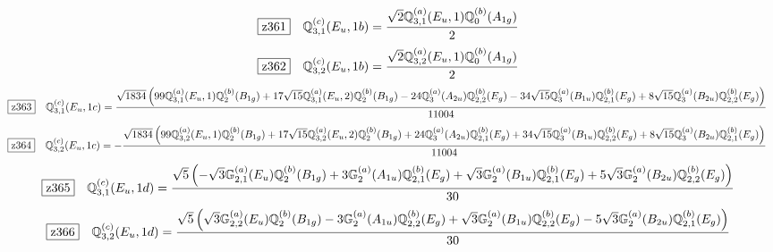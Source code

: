 \documentclass[fleqn,10pt,landscape]{jsarticle}
\begin{document}
\begin{dmath*}
\hspace*{3mm}\fbox{z361}\quad \mathbb{Q}_{3,1}^{(c)}(E_{u},1b)=\frac{\sqrt{2} \mathbb{Q}_{3,1}^{(a)}(E_{u},1) \mathbb{Q}_{0}^{(b)}(A_{1g})}{2}
\end{dmath*}
\begin{dmath*}
\hspace*{3mm}\fbox{z362}\quad \mathbb{Q}_{3,2}^{(c)}(E_{u},1b)=\frac{\sqrt{2} \mathbb{Q}_{3,2}^{(a)}(E_{u},1) \mathbb{Q}_{0}^{(b)}(A_{1g})}{2}
\end{dmath*}
\begin{dmath*}
\hspace*{3mm}\fbox{z363}\quad \mathbb{Q}_{3,1}^{(c)}(E_{u},1c)=\frac{\sqrt{1834} \left(99 \mathbb{Q}_{3,1}^{(a)}(E_{u},1) \mathbb{Q}_{2}^{(b)}(B_{1g}) + 17 \sqrt{15} \mathbb{Q}_{3,1}^{(a)}(E_{u},2) \mathbb{Q}_{2}^{(b)}(B_{1g}) - 24 \mathbb{Q}_{3}^{(a)}(A_{2u}) \mathbb{Q}_{2,2}^{(b)}(E_{g}) - 34 \sqrt{15} \mathbb{Q}_{3}^{(a)}(B_{1u}) \mathbb{Q}_{2,1}^{(b)}(E_{g}) + 8 \sqrt{15} \mathbb{Q}_{3}^{(a)}(B_{2u}) \mathbb{Q}_{2,2}^{(b)}(E_{g})\right)}{11004}
\end{dmath*}
\begin{dmath*}
\hspace*{3mm}\fbox{z364}\quad \mathbb{Q}_{3,2}^{(c)}(E_{u},1c)=- \frac{\sqrt{1834} \left(99 \mathbb{Q}_{3,2}^{(a)}(E_{u},1) \mathbb{Q}_{2}^{(b)}(B_{1g}) + 17 \sqrt{15} \mathbb{Q}_{3,2}^{(a)}(E_{u},2) \mathbb{Q}_{2}^{(b)}(B_{1g}) + 24 \mathbb{Q}_{3}^{(a)}(A_{2u}) \mathbb{Q}_{2,1}^{(b)}(E_{g}) + 34 \sqrt{15} \mathbb{Q}_{3}^{(a)}(B_{1u}) \mathbb{Q}_{2,2}^{(b)}(E_{g}) + 8 \sqrt{15} \mathbb{Q}_{3}^{(a)}(B_{2u}) \mathbb{Q}_{2,1}^{(b)}(E_{g})\right)}{11004}
\end{dmath*}
\begin{dmath*}
\hspace*{3mm}\fbox{z365}\quad \mathbb{Q}_{3,1}^{(c)}(E_{u},1d)=\frac{\sqrt{5} \left(- \sqrt{3} \mathbb{G}_{2,1}^{(a)}(E_{u}) \mathbb{Q}_{2}^{(b)}(B_{1g}) + 3 \mathbb{G}_{2}^{(a)}(A_{1u}) \mathbb{Q}_{2,1}^{(b)}(E_{g}) + \sqrt{3} \mathbb{G}_{2}^{(a)}(B_{1u}) \mathbb{Q}_{2,1}^{(b)}(E_{g}) + 5 \sqrt{3} \mathbb{G}_{2}^{(a)}(B_{2u}) \mathbb{Q}_{2,2}^{(b)}(E_{g})\right)}{30}
\end{dmath*}
\begin{dmath*}
\hspace*{3mm}\fbox{z366}\quad \mathbb{Q}_{3,2}^{(c)}(E_{u},1d)=\frac{\sqrt{5} \left(\sqrt{3} \mathbb{G}_{2,2}^{(a)}(E_{u}) \mathbb{Q}_{2}^{(b)}(B_{1g}) - 3 \mathbb{G}_{2}^{(a)}(A_{1u}) \mathbb{Q}_{2,2}^{(b)}(E_{g}) + \sqrt{3} \mathbb{G}_{2}^{(a)}(B_{1u}) \mathbb{Q}_{2,2}^{(b)}(E_{g}) - 5 \sqrt{3} \mathbb{G}_{2}^{(a)}(B_{2u}) \mathbb{Q}_{2,1}^{(b)}(E_{g})\right)}{30}
\end{dmath*}
\end{document}
